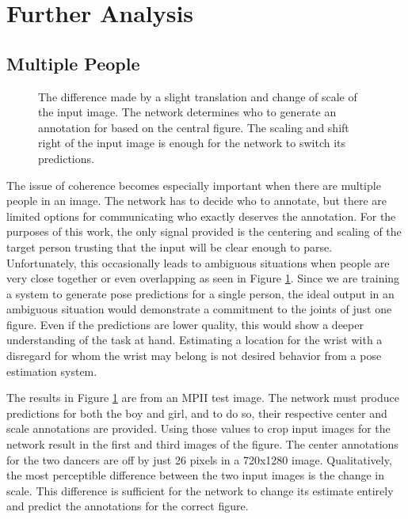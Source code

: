 \documentclass[runningheads]{llncs}
\begin{document}

\section{Further Analysis}

\subsection{Multiple People}

\begin{figure}[t]
  \caption{The difference made by a slight translation and change of
    scale of the input image. The network determines who to generate
    an annotation for based on the central figure. The scaling and
    shift right of the input image is enough for the network to
    switch its predictions.}
  \label{fig:multi}
\end{figure}

The issue of coherence becomes especially important when there are
multiple people in an image. The network has to decide who to
annotate, but there are limited options for communicating who exactly
deserves the annotation. For the purposes of this work, the only
signal provided is the centering and scaling of the target person
trusting that the input will be clear enough to parse. Unfortunately,
this occasionally leads to ambiguous situations when people are very
close together or even overlapping as seen in Figure
\ref{fig:multi}. Since we are training a system to generate pose
predictions for a single person, the ideal output in an ambiguous
situation would demonstrate a commitment to the joints of just one
figure. Even if the predictions are lower quality, this would show a
deeper understanding of the task at hand. Estimating a location for
the wrist with a disregard for whom the wrist may belong is not
desired behavior from a pose estimation system.

The results in Figure \ref{fig:multi} are from an MPII test image. The
network must produce predictions for both the boy and girl, and to do
so, their respective center and scale annotations are provided. Using
those values to crop input images for the network result in the first
and third images of the figure. The center annotations for the two
dancers are off by just 26 pixels in a 720x1280 image. Qualitatively,
the most perceptible difference between the two input images is the
change in scale. This difference is sufficient for the network to
change its estimate entirely and predict the annotations for the
correct figure.
\end{document}
